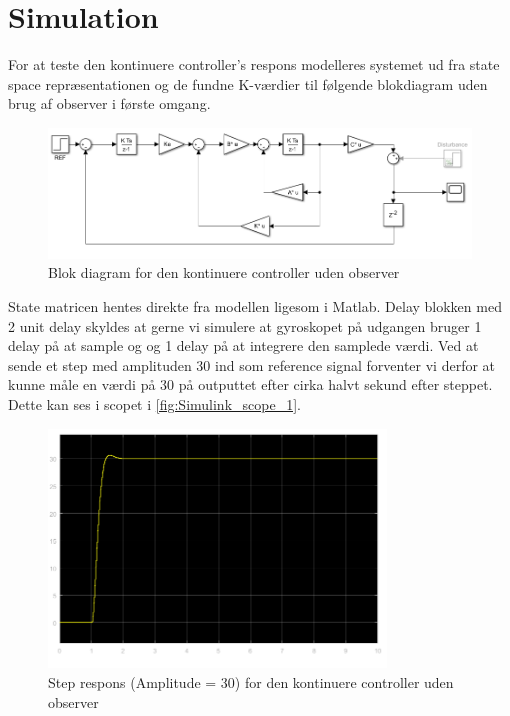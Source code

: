 \section{Simulation}
For at teste den kontinuere controller's respons modelleres systemet ud fra state space repræsentationen og de fundne K-værdier til følgende blokdiagram uden brug af observer i første omgang. 

\begin{figure}[H]
	\centering
	\includegraphics[width = 1\textwidth]{figur/Simulink_blokdiagram_1}
	\caption{Blok diagram for den kontinuere controller uden observer}
	\label{fig:Simulink_blokdiagram_1}
\end{figure}

State matricen hentes direkte fra modellen ligesom i Matlab. Delay blokken med 2 unit delay skyldes at gerne vi simulere at gyroskopet på udgangen bruger 1 delay på at sample og og 1 delay på at integrere den samplede værdi.
Ved at sende et step med amplituden 30 ind som reference signal forventer vi derfor at kunne måle en værdi på 30 på outputtet efter cirka halvt sekund efter steppet. Dette kan ses i scopet i \autoref{fig:Simulink_scope_1}.

\begin{figure}[H]
	\centering
	\includegraphics[width = 0.8\textwidth]{figur/Simulink_scope_1}
	\caption{Step respons (Amplitude = 30) for den kontinuere controller uden observer}
	\label{fig:Simulink_scope_1}
\end{figure}

